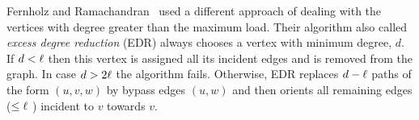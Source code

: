 Fernholz and Ramachandran~\cite{1283432} used a different approach of dealing with the vertices with degree greater than the maximum load.  Their algorithm also called \emph{excess degree reduction} (EDR) always chooses a vertex with minimum degree, $d$. If $d<\ell$ then this vertex is assigned all its incident edges and is removed from the graph. In case $d>2\ell$ the algorithm fails. Otherwise, EDR replaces $d-\ell$ paths of the form
$(u, v, w)$ by bypass edges $(u, w)$ and then orients all remaining edges ($\le \ell$ ) incident to $v$
towards $v$.

%
%
%

